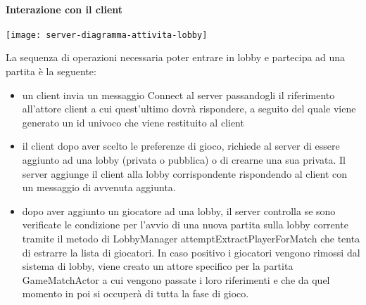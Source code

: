\paragraph{Interazione con il client}
\begin{center}
    \texttt{[image: server-diagramma-attivita-lobby]}
\end{center}
La sequenza di operazioni necessaria poter entrare in lobby e partecipa ad una partita è la seguente:
\begin{itemize}
    \item un client invia un messaggio Connect al server passandogli il riferimento all’attore client a cui quest’ultimo dovrà rispondere, a seguito del quale viene generato un id univoco che viene restituito al client
    \item il client dopo aver scelto le preferenze di gioco, richiede al server di essere aggiunto ad una lobby (privata o pubblica) o di crearne una sua privata.
    Il server aggiunge il client alla lobby corrispondente rispondendo al client con un messaggio di avvenuta aggiunta.
    \item dopo aver aggiunto un giocatore ad una lobby, il server controlla se sono verificate le condizione per l’avvio di una nuova partita sulla lobby corrente tramite il metodo di LobbyManager attemptExtractPlayerForMatch che tenta di estrarre la lista di giocatori.
    In caso positivo i giocatori vengono rimossi dal sistema di lobby, viene creato un attore specifico per la partita GameMatchActor a cui vengono passate i loro riferimenti e che da quel momento in poi si occuperà di tutta la fase di gioco.
\end{itemize}


